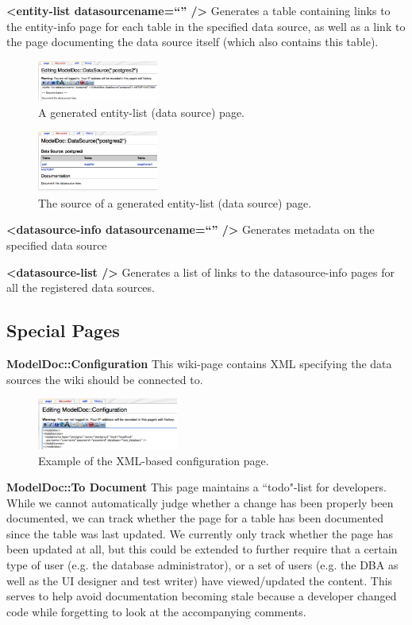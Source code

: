 \documentclass[nocopyrightspace]{acm_proc_article-sp}
\begin{document}
\textbf{<entity-list datasourcename=``'' />}
Generates a table containing links to the entity-info page for each table in
the specified data source, as well as a link to the page documenting the data
source itself (which also contains this table).

\begin{figure}[htbp]
\centering
\includegraphics[width=150px]{entity-list-input.pdf}
\caption{A generated entity-list (data source) page.}
\end{figure}

\begin{figure}[htbp]
\centering
\includegraphics[width=150px]{entity-list-output.pdf}
\caption{The source of a generated entity-list (data source) page.}
\end{figure}

\textbf{<datasource-info datasourcename=``'' />}
Generates metadata on the specified data source

\textbf{<datasource-list />}
Generates a list of links to the datasource-info pages for all the registered
data sources.

\subsection{Special Pages}

\textbf{ModelDoc::Configuration}
This wiki-page contains XML specifying the data sources the wiki should be
connected to.

\begin{figure}[htbp]
\centering
\includegraphics[width=175px]{configuration.pdf}
\caption{Example of the XML-based configuration page.}
\end{figure}

\textbf{ModelDoc::To Document}
This page maintains a ``todo"-list for
developers.  While we cannot automatically judge whether a change has been
properly been documented, we can track whether the page for a table has been
documented since the table was last updated.  We currently only track whether
the page has been updated at all, but this could be extended to further require
that a certain type of user (e.g. the database administrator), or a set of
users (e.g. the DBA as well as the UI designer and test writer) have
viewed/updated the content.  This serves to help avoid documentation becoming
stale because a developer changed code while forgetting to look at the
accompanying comments.
\end{document}
